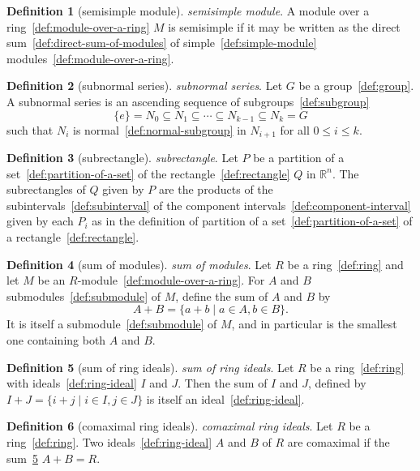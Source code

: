 \documentclass[12pt,a4paper]{article}
\theoremstyle{definition}
\newtheorem{definition}{Definition}
\begin{document}
\begin{definition}[semisimple module]\label{def:semisimple-module}
\emph{semisimple module}. A module over a ring~\ref{def:module-over-a-ring} $M$ is semisimple if it may be written as the direct sum~\ref{def:direct-sum-of-modules} of simple~\ref{def:simple-module} modules~\ref{def:module-over-a-ring}.
\end{definition}

\begin{definition}[subnormal series]\label{def:subnormal-series}
\emph{subnormal series}. Let $G$ be a group~\ref{def:group}. A subnormal series is an ascending sequence of subgroups~\ref{def:subgroup} $$\{e\} = N_0\subseteq N_1\subseteq \cdots\subseteq N_{k-1} \subseteq N_k = G$$ such that $N_i$ is normal~\ref{def:normal-subgroup} in $N_{i+1}$ for all $0\leq i\leq k$.
\end{definition}

\begin{definition}[subrectangle]\label{def:subrectangle}
\emph{subrectangle}. Let $P$ be a partition of a set~\ref{def:partition-of-a-set} of the rectangle~\ref{def:rectangle} $Q$ in $\mathbb R^n$. The subrectangles of $Q$ given by $P$ are the products of the subintervals~\ref{def:subinterval} of the component intervals~\ref{def:component-interval} given by each $P_i$ as in the definition of partition of a set~\ref{def:partition-of-a-set} of a rectangle~\ref{def:rectangle}.
\end{definition}

\begin{definition}[sum of modules]\label{def:sum-of-modules}
\emph{sum of modules}. Let $R$ be a ring~\ref{def:ring} and let $M$ be an $R$-module~\ref{def:module-over-a-ring}. For $A$ and $B$ submodules~\ref{def:submodule} of $M$, define the sum of $A$ and $B$ by $$A+B = \{a+b\mid a\in A,b\in B\}.$$ It is itself a submodule~\ref{def:submodule} of $M$, and in particular is the smallest one containing both $A$ and $B$.
\end{definition}

\begin{definition}[sum of ring ideals]\label{def:sum-of-ring-ideals}
\emph{sum of ring ideals}. Let $R$ be a ring~\ref{def:ring} with ideals~\ref{def:ring-ideal} $I$ and $J$. Then the sum of $I$ and $J$, defined by $I+J= \{i+j \mid i\in I,j\in J\}$ is itself an ideal~\ref{def:ring-ideal}.
\end{definition}

\begin{definition}[comaximal ring ideals]\label{def:comaximal-ring-ideals}
\emph{comaximal ring ideals}. Let $R$ be a ring~\ref{def:ring}. Two ideals~\ref{def:ring-ideal} $A$ and $B$ of $R$ are comaximal if the sum~\ref{def:sum-of-ring-ideals} $A+B=R$.
\end{definition}
\end{document}

